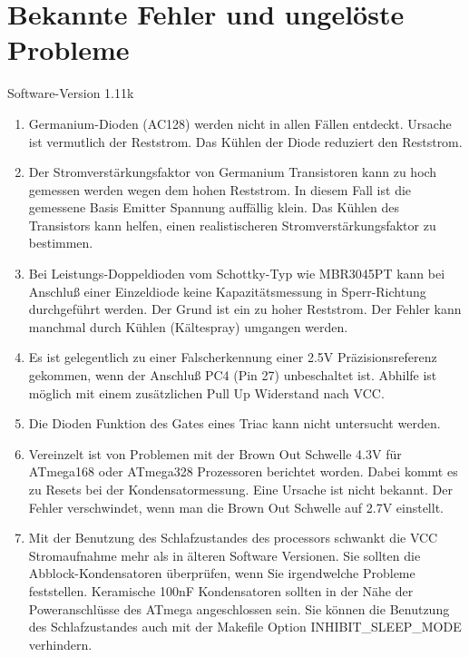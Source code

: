 
\chapter{Bekannte Fehler und ungelöste Probleme}
{\center Software-Version 1.11k}

\begin{enumerate}

\item Germanium-Dioden (AC128) werden nicht in allen Fällen entdeckt. Ursache ist vermutlich der Reststrom.
Das Kühlen der Diode reduziert den Reststrom.

\item Der Stromverstärkungsfaktor von Germanium Transistoren kann zu hoch gemessen werden wegen dem hohen Reststrom.
In diesem Fall ist die gemessene Basis Emitter Spannung auffällig klein.
Das Kühlen des Transistors kann helfen, einen realistischeren Stromverstärkungsfaktor zu bestimmen.

\item Bei Leistungs-Doppeldioden vom Schottky-Typ wie MBR3045PT kann bei Anschluß einer Einzeldiode keine Kapazitätsmessung in Sperr-Richtung 
durchgeführt werden. Der Grund ist ein zu hoher Reststrom. Der Fehler kann manchmal durch Kühlen (Kältespray) umgangen werden.

\item Es ist gelegentlich zu einer Falscherkennung einer 2.5V Präzisionsreferenz gekommen, wenn der Anschluß PC4 (Pin 27) unbeschaltet ist.
Abhilfe ist möglich mit einem zusätzlichen Pull Up Widerstand nach VCC.

\item Die Dioden Funktion des Gates eines Triac kann nicht untersucht werden.

\item Vereinzelt ist von Problemen mit der Brown Out Schwelle 4.3V für ATmega168 oder ATmega328 Prozessoren berichtet worden.
Dabei kommt es zu Resets bei der Kondensatormessung.  Eine Ursache ist nicht bekannt.
Der Fehler verschwindet, wenn man die Brown Out Schwelle auf 2.7V einstellt.

\item Mit der Benutzung des Schlafzustandes des processors schwankt die VCC Stromaufnahme mehr als
in älteren Software Versionen.
Sie sollten die Abblock-Kondensatoren überprüfen, wenn Sie irgendwelche Probleme feststellen.
Keramische 100nF Kondensatoren sollten in der Nähe der Poweranschlüsse des ATmega angeschlossen sein.
Sie können die Benutzung des Schlafzustandes auch mit der Makefile Option INHIBIT\_SLEEP\_MODE verhindern.


\end{enumerate}
